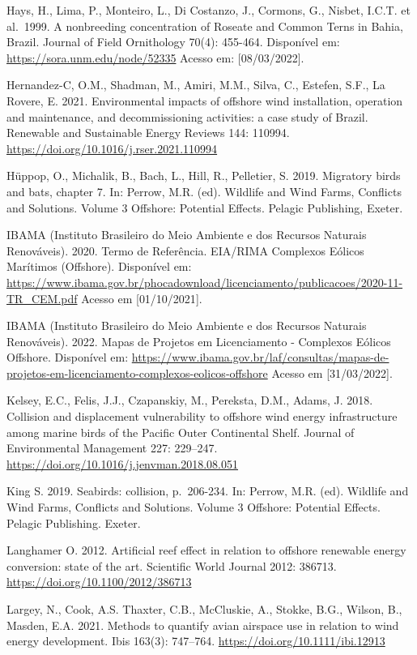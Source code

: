 \documentclass[
  oneside]{scrbook}
\begin{document}
Hays, H., Lima, P., Monteiro, L., Di Costanzo, J., Cormons, G., Nisbet, I.C.T. et al.~1999. A nonbreeding concentration of Roseate and Common Terns in Bahia, Brazil. Journal of Field Ornithology 70(4): 455-464. Disponível em: \url{https://sora.unm.edu/node/52335} Acesso em: {[}08/03/2022{]}.

Hernandez-C, O.M., Shadman, M., Amiri, M.M., Silva, C., Estefen, S.F., La Rovere, E. 2021. Environmental impacts of offshore wind installation, operation and maintenance, and decommissioning activities: a case study of Brazil. Renewable and Sustainable Energy Reviews 144: 110994. \url{https://doi.org/10.1016/j.rser.2021.110994}

Hüppop, O., Michalik, B., Bach, L., Hill, R., Pelletier, S. 2019. Migratory birds and bats, chapter 7. In: Perrow, M.R. (ed). Wildlife and Wind Farms, Conflicts and Solutions. Volume 3 Offshore: Potential Effects. Pelagic Publishing, Exeter.

IBAMA (Instituto Brasileiro do Meio Ambiente e dos Recursos Naturais Renováveis). 2020. Termo de Referência. EIA/RIMA Complexos Eólicos Marítimos (Offshore). Disponível em: \url{https://www.ibama.gov.br/phocadownload/licenciamento/publicacoes/2020-11-TR_CEM.pdf} Acesso em {[}01/10/2021{]}.

IBAMA (Instituto Brasileiro do Meio Ambiente e dos Recursos Naturais Renováveis). 2022. Mapas de Projetos em Licenciamento - Complexos Eólicos Offshore. Disponível em: \url{https://www.ibama.gov.br/laf/consultas/mapas-de-projetos-em-licenciamento-complexos-eolicos-offshore} Acesso em {[}31/03/2022{]}.

Kelsey, E.C., Felis, J.J., Czapanskiy, M., Pereksta, D.M., Adams, J. 2018. Collision and displacement vulnerability to offshore wind energy infrastructure among marine birds of the Pacific Outer Continental Shelf. Journal of Environmental Management 227: 229--247. \url{https://doi.org/10.1016/j.jenvman.2018.08.051}

King S. 2019. Seabirds: collision, p.~206-234. In: Perrow, M.R. (ed). Wildlife and Wind Farms, Conflicts and Solutions. Volume 3 Offshore: Potential Effects. Pelagic Publishing. Exeter.

Langhamer O. 2012. Artificial reef effect in relation to offshore renewable energy conversion: state of the art. Scientific World Journal 2012: 386713. \url{https://doi.org/10.1100/2012/386713}

Largey, N., Cook, A.S. Thaxter, C.B., McCluskie, A., Stokke, B.G., Wilson, B., Masden, E.A. 2021. Methods to quantify avian airspace use in relation to wind energy development. Ibis 163(3): 747--764. \url{https://doi.org/10.1111/ibi.12913}
\end{document}
